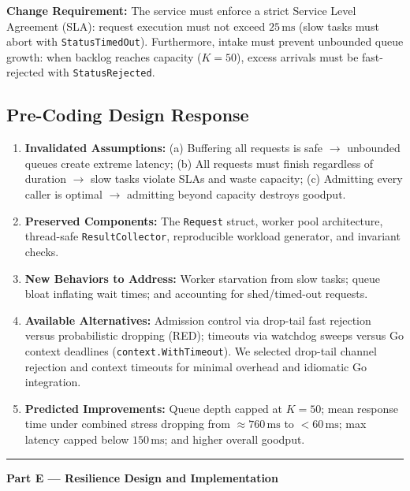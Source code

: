 \documentclass[11pt]{article}
\begin{document}
\noindent\textbf{Change Requirement:}
The service must enforce a strict Service Level Agreement (SLA): request execution must not exceed $25\,\text{ms}$ (slow tasks must abort with \texttt{StatusTimedOut}). Furthermore, intake must prevent unbounded queue growth: when backlog reaches capacity ($K = 50$), excess arrivals must be fast-rejected with \texttt{StatusRejected}.

\subsection*{Pre-Coding Design Response}
\begin{enumerate}[label=\textbf{\arabic*.}, leftmargin=1.5em, itemsep=0.35em]
    \item \textbf{Invalidated Assumptions:}
    (a) Buffering all requests is safe $\to$ unbounded queues create extreme latency; (b) All requests must finish regardless of duration $\to$ slow tasks violate SLAs and waste capacity; (c) Admitting every caller is optimal $\to$ admitting beyond capacity destroys goodput.
    \item \textbf{Preserved Components:}
    The \texttt{Request} struct, worker pool architecture, thread-safe \texttt{ResultCollector}, reproducible workload generator, and invariant checks.
    \item \textbf{New Behaviors to Address:}
    Worker starvation from slow tasks; queue bloat inflating wait times; and accounting for shed/timed-out requests.
    \item \textbf{Available Alternatives:}
    Admission control via drop-tail fast rejection versus probabilistic dropping (RED); timeouts via watchdog sweeps versus Go context deadlines (\texttt{context.WithTimeout}). We selected drop-tail channel rejection and context timeouts for minimal overhead and idiomatic Go integration.
    \item \textbf{Predicted Improvements:}
    Queue depth capped at $K=50$; mean response time under combined stress dropping from $\approx 760\,\text{ms}$ to $< 60\,\text{ms}$; max latency capped below $150\,\text{ms}$; and higher overall goodput.
\end{enumerate}

\vspace{1.5em}\hrule\vspace{1.2em}

\newpage
{\centering\fontsize{14}{17}\selectfont\textbf{Part E --- Resilience Design and Implementation}\par}
\vspace{0.6em}
\end{document}
